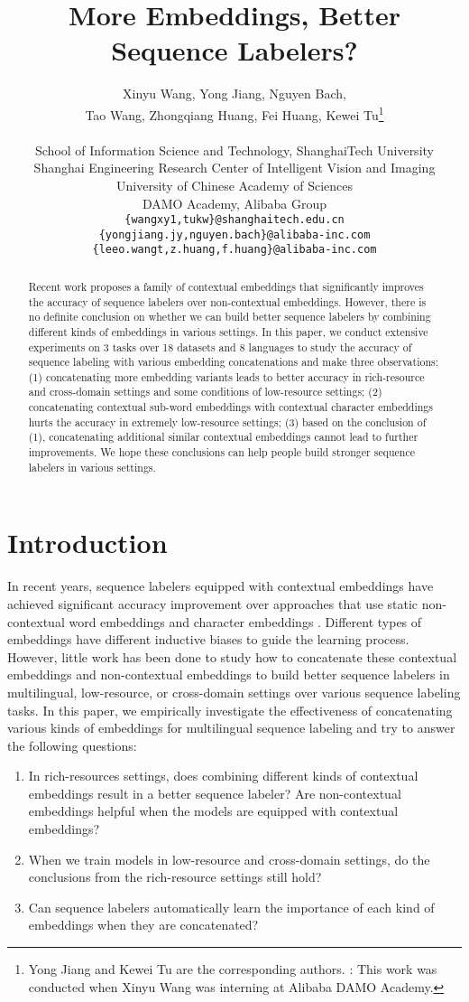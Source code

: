\documentclass[11pt,a4paper]{article}
\title{More Embeddings, Better Sequence Labelers?}
\author{\parbox{\linewidth}{\centering Xinyu Wang, Yong Jiang\textsuperscript{}, Nguyen Bach, \\ Tao Wang, Zhongqiang Huang, Fei Huang,  Kewei Tu\thanks{\hspace{1mm} Yong Jiang and Kewei Tu are the corresponding authors. : This work was conducted when Xinyu Wang was interning at Alibaba DAMO Academy.}} \\
 School of Information Science and Technology, ShanghaiTech University \\
 Shanghai Engineering Research Center of Intelligent Vision and Imaging \\
University of Chinese Academy of Sciences \\
 DAMO Academy, Alibaba Group \\
  {\tt \{wangxy1,tukw\}@shanghaitech.edu.cn} \\
  {\tt \{yongjiang.jy,nguyen.bach\}@alibaba-inc.com} \\
  {\tt \{leeo.wangt,z.huang,f.huang\}@alibaba-inc.com} \\
 }
\date{}
\begin{document}
\maketitle
\begin{abstract}
Recent work proposes a family of contextual embeddings that significantly improves the accuracy of sequence labelers over non-contextual embeddings. However, there is no definite conclusion on whether we can build better sequence labelers by combining different kinds of embeddings in various settings. 
In this paper, we conduct extensive experiments on 3 tasks over 18 datasets and 8 languages to study the accuracy of sequence labeling with various embedding concatenations and make three observations: (1) concatenating more embedding variants leads to better accuracy in rich-resource and cross-domain settings and some conditions of low-resource settings; (2) concatenating contextual sub-word embeddings with contextual character embeddings hurts the accuracy in extremely low-resource settings; (3) based on the conclusion of (1), concatenating additional similar contextual embeddings cannot lead to further improvements. We hope these conclusions can help people build stronger sequence labelers in various settings.


\end{abstract}


\section{Introduction}
\label{sec:introduction}
In recent years, sequence labelers equipped with contextual embeddings have achieved significant accuracy improvement \cite{peters-etal-2018-deep,akbik-etal-2018-contextual,devlin-etal-2019-bert,martin2019camembert} over approaches that use static non-contextual word embeddings \cite{mikolov2013distributed} and character embeddings \cite{santos2014learning}.
Different types of embeddings have different inductive biases to guide the learning process. However, little work has been done to study how to concatenate these contextual embeddings and non-contextual embeddings to build better sequence labelers in multilingual, low-resource, or cross-domain settings over various sequence labeling tasks. In this paper, we empirically investigate the effectiveness of concatenating various kinds of embeddings for multilingual sequence labeling and try to answer the following questions:
\begin{enumerate}
    \item In rich-resources settings, does combining different kinds of contextual embeddings result in a better sequence labeler? Are non-contextual embeddings helpful when the models are equipped with contextual embeddings?
    \item When we train models in low-resource and cross-domain settings, do the conclusions from the rich-resource settings still hold? 
    \item Can sequence labelers automatically learn the importance of each kind of embeddings when they are concatenated?
\end{enumerate}
\end{document}

